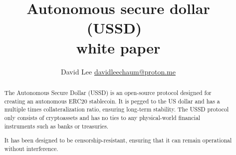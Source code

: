 \documentclass{article}
\begin{document}
\title{Autonomous secure dollar (USSD)\ \\white paper}

\author{David Lee \href{mailto:davidleechaum@proton.me}{davidleechaum@proton.me}}

\maketitle

%
\begin{abstract}
The Autonomous Secure Dollar (USSD) is an open-source protocol designed 
for creating an autonomous ERC20 stablecoin. It is pegged to the US dollar 
and has a multiple times collateralization ratio, ensuring long-term stability. 
The USSD protocol only consists of cryptoassets and has no ties to any 
physical-world financial instruments such as banks or treasuries. 

It has been designed to be censorship-resistant, ensuring that it can
remain operational without interference.


\end{abstract}


\newpage

\tableofcontents

\newpage








 
\end{document}

